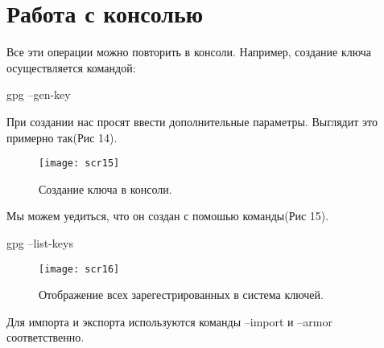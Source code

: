 \documentclass{article}
\begin{document}
\section[8]{Работа с консолью}
Все эти операции можно повторить в консоли. Например, создание ключа осуществляется командой:
\begin{verbatim*}
	gpg --gen-key
\end{verbatim*}
При создании нас просят ввести дополнительные параметры. Выглядит это примерно так(Рис 14).
\begin{figure}
	\center
	\texttt{[image: scr15]}
	\caption{Создание ключа в консоли.}
\end{figure}
Мы можем уедиться, что он создан с помошью команды(Рис 15).
\begin{verbatim*}
	gpg --list-keys
\end{verbatim*}

\begin{figure}
	\center
	\texttt{[image: scr16]}
	\caption{Отображение всех зарегестрированных в система ключей.}
\end{figure}

Для импорта и экспорта используются команды --import и --armor соответственно.
\end{document}
